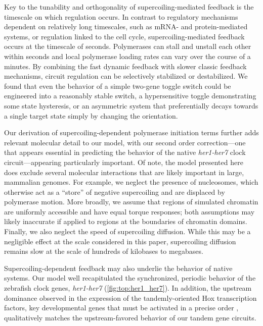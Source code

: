 \documentclass[11pt]{article}
\begin{document}
Key to the tunability and orthogonality of supercoiling-mediated feedback is the timescale on which regulation occurs. In contrast to regulatory mechanisms dependent on relatively long timescales, such as mRNA- and protein-mediated systems, or regulation linked to the cell cycle, supercoiling-mediated feedback occurs at the timescale of seconds. Polymerases can stall and unstall each other within seconds and local polymerase loading rates can vary over the course of a minutes. By combining the fast dynamic feedback with slower classic feedback mechanisms, circuit regulation can be selectively stabilized or destabilized. We found that even the behavior of a simple two-gene toggle switch could be engineered into a reasonably stable switch, a hypersensitive toggle demonstrating some state hysteresis, or an asymmetric system that preferentially decays towards a single target state simply by changing the orientation.

Our derivation of supercoiling-dependent polymerase initiation terms further adds relevant molecular detail to our model, with our second order correction---one that appears essential in predicting the behavior of the native \emph{her1-her7} clock circuit---appearing particularly important. Of note, the model presented here does exclude several molecular interactions that are likely important in large, mammalian genomes. For example, we neglect the presence of nucleosomes, which otherwise act as a ``store'' of negative supercoiling and are displaced by polymerase motion. More broadly, we assume that regions of simulated chromatin are uniformly accessible and have equal torque responses; both assumptions may likely inaccurate if applied to regions at the boundaries of chromatin domains. Finally, we also neglect the speed of supercoiling diffusion. While this may be a negligible effect at the scale considered in this paper, supercoiling diffusion remains slow at the scale of hundreds of kilobases to megabases.


Supercoiling-dependent feedback may also underlie the behavior of native systems. Our model well recapitulated the synchronized, periodic behavior of the zebrafish clock genes, \textit{her1-her7} (\cref{fig:top:her1_her7}). In addition, the upstream dominance observed in the expression of the tandemly-oriented Hox transcription factors, key developmental genes that must be activated in a precise order \parencite{darbellayConstrainedArchitectureMammalian2019}, qualitatively matches the upstream-favored behavior of our tandem gene circuits.
\end{document}
